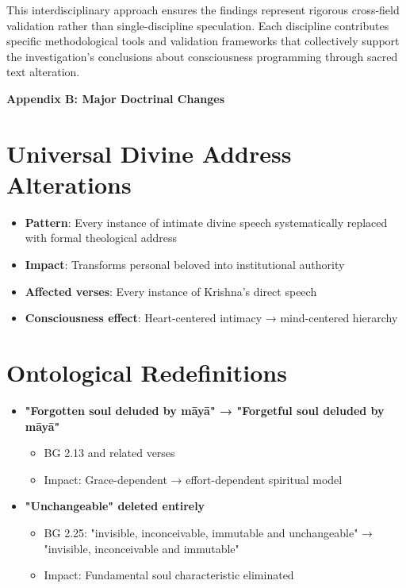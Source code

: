 \documentclass[11pt,twoside]{book}
\begin{document}
This interdisciplinary approach ensures the findings represent rigorous cross-field validation rather than single-discipline speculation. Each discipline contributes specific methodological tools and validation frameworks that collectively support the investigation's conclusions about consciousness programming through sacred text alteration.

\clearpage
\pagestyle{sectionopening}
\thispagestyle{sectionopening}
\markboth{}{}
\markright{}
\vspace*{0.25\textheight}
\begin{center}
{\Huge\bfseries Appendix B: Major Doctrinal Changes}
\end{center}
\newpage
\section*{Universal Divine Address Alterations}
\label{sec:orge4b4561}
\begin{itemize}
\item \textbf{\textbf{Pattern}}: Every instance of intimate divine speech systematically replaced with formal theological address
\item \textbf{\textbf{Impact}}: Transforms personal beloved into institutional authority
\item \textbf{\textbf{Affected verses}}: Every instance of Krishna's direct speech
\item \textbf{\textbf{Consciousness effect}}: Heart-centered intimacy → mind-centered hierarchy
\end{itemize}
\section*{Ontological Redefinitions}
\label{sec:orgbc3a551}
\begin{itemize}
\item \textbf{\textbf{"Forgotten soul deluded by māyā" → "Forgetful soul deluded by māyā"}}
\begin{itemize}
\item BG 2.13 and related verses
\item Impact: Grace-dependent → effort-dependent spiritual model
\end{itemize}

\item \textbf{\textbf{"Unchangeable" deleted entirely}}
\begin{itemize}
\item BG 2.25: "invisible, inconceivable, immutable and unchangeable" → "invisible, inconceivable and immutable"
\item Impact: Fundamental soul characteristic eliminated
\end{itemize}
\end{itemize}
\end{document}
